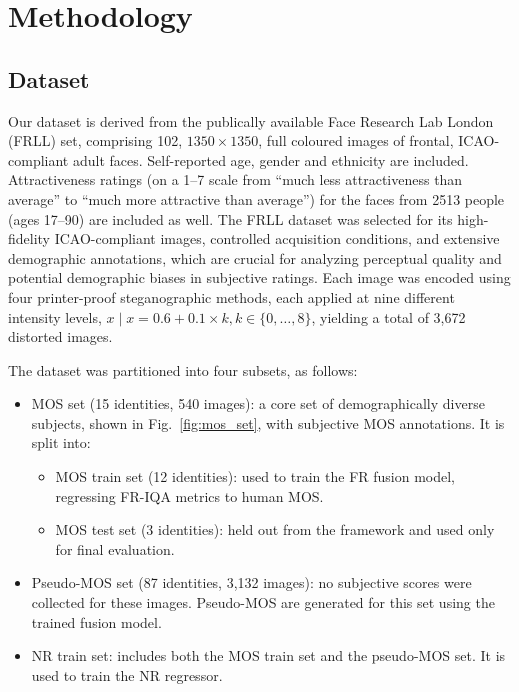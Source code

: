 \chapter{Methodology}\label{chap:methodology}

\section{Dataset}

Our dataset is derived from the publically available Face Research Lab London~\cite{frll} (FRLL) set, comprising 102, $1350 \times 1350$, full coloured images of frontal, ICAO-compliant adult faces. Self-reported age, gender and ethnicity are included. Attractiveness ratings (on a 1--7 scale from ``much less attractiveness than average'' to ``much more attractive than average'') for the faces from 2513 people (ages 17--90) are included as well. The FRLL dataset was selected for its high-fidelity ICAO-compliant images, controlled acquisition conditions, and extensive demographic annotations, which are crucial for analyzing perceptual quality and potential demographic biases in subjective ratings. Each image was encoded using four printer-proof steganographic methods, each applied at nine different intensity levels, $x \mid x = 0.6 + 0.1 \times k, k \in \{0, \hdots, 8\}$, yielding a total of 3,672 distorted images.

The dataset was partitioned into four subsets, as follows:

\begin{itemize}
    \item MOS set (15 identities, 540 images): a core set of demographically diverse subjects, shown in Fig.~\ref{fig:mos_set}, with subjective MOS annotations. It is split into:
    \begin{itemize}
        \item MOS train set (12 identities): used to train the FR fusion model, regressing FR-IQA metrics to human MOS.\@
        \item MOS test set (3 identities): held out from the framework and used only for final evaluation.
    \end{itemize}
    \item Pseudo-MOS set (87 identities, 3,132 images): no subjective scores were collected for these images. Pseudo-MOS are generated for this set using the trained fusion model.
    \item NR train set: includes both the MOS train set and the pseudo-MOS set. It is used to train the NR regressor.
\end{itemize}

